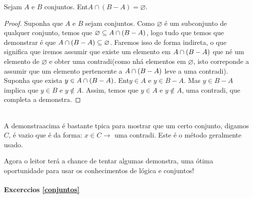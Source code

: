 \begin{teob}
Sejam $A$ e $B$ conjuntos. Ent\ao $A\cap(B-A)=\varnothing.$
\end{teob}
\begin{proof}
Suponha que $A$ e $B$ sejam conjuntos. Como $\varnothing$ \'e um subconjunto de qualquer conjunto, temos que $\varnothing\subseteq A\cap(B-A)$, logo tudo que temos que demonstrar \'e que $A\cap(B-A)\subseteq\varnothing$. Faremos isso de forma indireta, o que significa que iremos assumir que existe um elemento  em $A\cap(B-A)$ que n\ao \'e um elemento de $\varnothing$ e obter uma contradi\cao (como n\ao h\'a elementos em $\varnothing$, isto correponde a assumir que um elemento pertencente a $A\cap(B-A)$ leve a uma contradi\caoi). Suponha que exista $y\in A\cap(B-A)$. Ent\ao $y\in A$ e $y\in B-A$. Mas $y\in B-A$ implica que $y\in B$ e $y\notin A$. Assim, temos que $y\in A$ e $y\notin A$, uma contradi\caoi, que completa a demonstra\caoi. 
\end{proof}
\\

A demonstra\cao acima \'e bastante t\ih pica para mostrar que um certo conjunto, digamos $C$, \'e vazio que \'e da forma: $x\in C\to$ uma contradi\caoi. Este \'e o m\'etodo geralmente usado. 

Agora o leitor ter\'a a chance de tentar algumas demonstra\cois, uma \'otima oportunidade para usar os conhecimentos de l\'ogica e conjuntos!

\paragraph{Excerc\ih cios \ref{conjuntos}}

